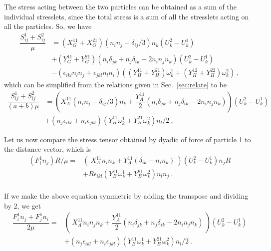 \documentclass[reprint, amsmath,amssymb,aps,pre,onecolumn,notitlepage%
]{revtex4-1}
\begin{document}
The stress acting between the two particles can be obtained as a sum of the individual stresslets, since the total stress is a sum of all the stresslets acting on all the particles. So, we have
\begin{equation}
	\begin{split}
\dfrac{ S_{ij}^1+S_{ij}^2 }{ \mu } &= (X_G^{11}+ X_G^{21})(n_in_j-\delta_{ij}/3)n_k  (U_k^2-U_k^1)\\
&+(Y_G^{11}+Y_G^{21})(n_i\delta_{jk}+n_j\delta_{ik}-2n_in_jn_k) (U_k^2-U_k^1)\\
		&- \left(\epsilon_{ikl} n_l n_j+\epsilon_{jkl} n_l n_i \right)((Y_H^{11}+Y_H^{21})\omega_k^1+(Y_H^{12}+Y_H^{22})\omega_k^2)\ ,
	\end{split}
\end{equation}
which can be simplified from the relations given in Sec.~\ref{sec:relate} to be 
\begin{equation}
	\begin{split}
	\dfrac{ S^1_{ij}+S^2_{ij} }{(a+b)\mu }&=\left( X_A^{11} (n_in_j-\delta_{ij}/3)n_k+\dfrac{Y_A^{11}}{2}(n_i\delta_{jk}+n_j\delta_{ik}-2n_in_jn_k) \right)(U_k^2-U_k^1) \\ 
	&+ \left(n_j \epsilon_{ikl} +  n_i\epsilon_{jkl} \right)(Y_B^{11}\omega_k^1+Y_B^{21}\omega_k^2)n_l/2 \ ,
	       \end{split}
	       \label{eq:simp_stresslet}
\end{equation}

Let us now compare the stress tensor obtained by dyadic of force of particle 1 to the distance vector, which is
\begin{equation}
\begin{split}
	(F^1_i n_j)R/\mu=& (\ X_A^{11}n_in_k+Y_A^{11}(\delta_{ik}-n_in_k)\ )(U^2_k-U^1_k) n_j R\\
	&+ R \epsilon_{ikl} \left(Y_B^{11}\omega_k^1+Y_B^{21}\omega_k^2\right) n_l n_j \ .\\
\end{split}
\end{equation}

If we make the above equation symmetric by adding the transpose and dividing by 2, we get
\begin{equation}
\begin{split}
	\dfrac{F^1_i n_j+F^1_j n_i}{2 \mu}=& (\ X_A^{11} n_i n_j n_k + \dfrac{Y_A^{11}}{2}(n_i \delta_{jk}+n_j \delta_{ik}-2 n_in_jn_k)\ )(U^2_k-U^1_k) \\
	&+  ( n_j\epsilon_{ikl}+ n_i\epsilon_{jkl} ) \left(Y_B^{11}\omega_k^1+Y_B^{21}\omega_k^2\right) n_l/2  \ .\\
\end{split}
\end{equation}
\end{document}
